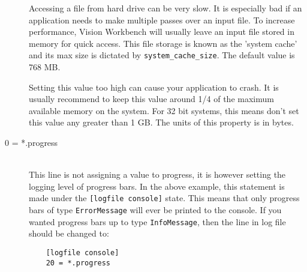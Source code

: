 \begin{description}
Accessing a file from hard drive can be very slow. It is especially
bad if an application needs to make multiple passes over an input
file. To increase performance, Vision Workbench will usually leave an
input file stored in memory for quick access. This file storage is
known as the 'system cache' and its max size is dictated by
\texttt{system\_cache\_size}. The default value is 768 MB.

Setting this value too high can cause your application to crash. It is
usually recommend to keep this value around 1/4 of the maximum
available memory on the system. For 32 bit systems, this means don't
set this value any greater than 1 GB. The units of this property is in bytes.

\item[0 = *.progress] \hfill \\

This line is not assigning a value to progress, it is however setting
the logging level of progress bars. In the above example, this
statement is made under the \texttt{[logfile console]} state. This
means that only progress bars of type \texttt{ErrorMessage} will ever
be printed to the console. If you wanted progress bars up to type \texttt{InfoMessage}, then the line in log file should be changed to:

\begin{verbatim}
    [logfile console]
    20 = *.progress
\end{verbatim}

\end{description}
